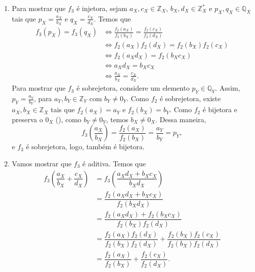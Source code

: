 \documentclass[../main.tex]{subfiles}
\begin{document}
\begin{dem}
\begin{enumerate}
\begin{enumerate}
            \item 
                Para mostrar que $f_3$ é injetora, sejam $a_X,c_X \in \mathbb{Z}_X$, $b_X,d_X \in \mathbb{Z}_X^*$ e $p_X,q_X \in \mathbb{Q}_X$ tais que $p_X = \frac{a_X}{b_X}$ e $q_X = \frac{c_X}{d_X}$. Temos que
                \begin{align*}
                    f_3(p_X) = f_3(q_X) 
                    &\iff \frac{f_2(a_X)}{f_2(b_X)} = \frac{f_2(c_X)}{f_2(d_X)} \\
                    &\iff f_2(a_X)f_2(d_X) = f_2(b_X)f_2(c_X) \\
                    &\iff f_2(a_Xd_X) = f_2(b_Xc_X) \\
                    &\iff a_Xd_X = b_Xc_X \\
                    &\iff \frac{a_X}{b_X} = \frac{c_X}{d_X}.
                \end{align*}
                Para mostrar que $f_3$ é sobrejetora, considere um elemento $p_Y \in \mathbb{Q}_Y$. Assim, $p_Y = \frac{a_Y}{b_Y}$, para $a_Y,b_Y \in \mathbb{Z}_Y$ com $b_Y \neq 0_Y$. Como $f_2$ é sobrejetora, existe $a_X, b_X \in \mathbb{Z}_X$ tais que $f_2(a_X) = a_Y$ e
                $f_2(b_X) = b_Y$. Como $f_2$ é bijetora e preserva o $0_X$ (), como $b_Y \neq 0_Y$, temos $b_X \neq 0_X$. Dessa maneira,
                \[ f_3\left( \frac{a_X}{b_X} \right) = \frac{f_2(a_X)}{f_2(b_X)} = \frac{a_Y}{b_Y} = p_Y, \]
                e $f_3$ é sobrejetora, logo, também é bijetora.
            
            \item Vamos mostrar que $f_3$ é aditiva. Temos que
                \begin{align*}
                    f_3 \left( \dfrac{a_X}{b_X} + \dfrac{c_X}{d_X} \right) &= 
                    f_3 \left(\dfrac{a_Xd_X+b_Xc_X}{b_Xd_X} \right) \\
                    &= \dfrac{f_2(a_Xd_X+b_Xc_X)}{f_2(b_Xd_X)} \\
                    &= \dfrac{f_2(a_Xd_X)+f_2(b_Xc_X)}{f_2(b_X)f_2(d_X)} \\
                    &= \dfrac{f_2(a_X)f_2(d_X)}{f_2(b_X)f_2(d_X)} + \dfrac{f_2(b_X)f_2(c_X)}{f_2(b_X)f_2(d_X)} \\
                    &= \dfrac{f_2(a_X)}{f_2(b_X)} + \dfrac{f_2(c_X)}{f_2(d_X)} .
                \end{align*}                  
                

\end{enumerate}
\end{enumerate}
\end{dem}
\end{document}
